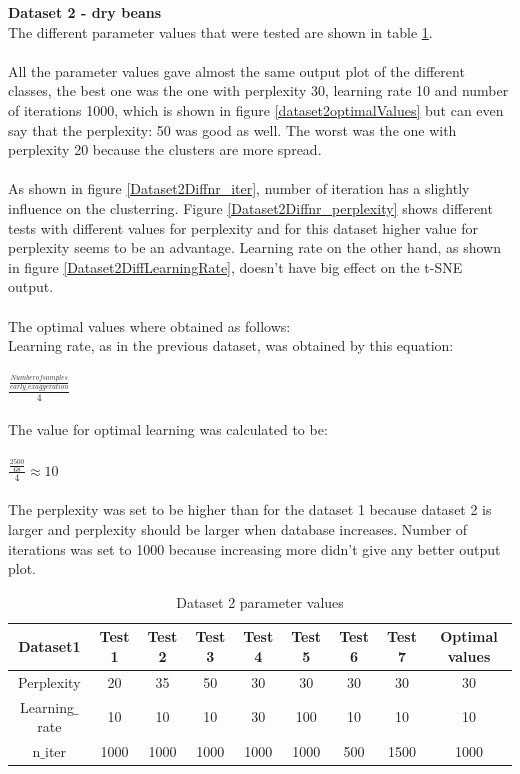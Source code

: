 \documentclass[12pt]{report}
\begin{document}
	\newpage
	\textbf{Dataset 2 - dry beans}\\
	The different parameter values that were tested are shown in table \ref{dataset2ParameterValues}. \\
	\\
	All the parameter values gave almost the same output plot of the different classes, the best one was the one with perplexity 30, learning rate 10 and number of iterations 1000, which is shown in figure \ref{dataset2optimalValues} but can even say that the perplexity: 50 was good as well. The worst was the one with perplexity 20 because the clusters are more spread.\\
	\\
	As shown in figure \ref{Dataset2Diffnr_iter}, number of iteration has a slightly influence on the clusterring. Figure \ref{Dataset2Diffnr_perplexity} shows different tests with different values for perplexity and for this dataset higher value for perplexity seems to be an advantage. Learning rate on the other hand, as shown in figure \ref{Dataset2DiffLearningRate}, doesn't have big effect on the t-SNE output.\\
	\\
	The optimal values where obtained as follows:\\
	Learning rate, as in the previous dataset, was obtained by this equation:\\
	\\
	$\frac{\frac{Number of samples}{early\_exaggeration}}{4}$\\
	\\
	The value for optimal learning was calculated to be:\\
	\\
	$\frac{\frac{2500}{68}}{4} \approx 10$\\
	\\
	The perplexity was set to be higher than for the dataset 1 because dataset 2 is larger and perplexity should be larger when database increases. Number of iterations was set to 1000 because increasing more didn't give any better output plot.\\
	\newpage
	
	\begin{table}[H]
		\centering
		\begin{tabular}{|c|c|c|c|c|c|c|c|c|}
			\hline
			Dataset1 & Test 1 & Test 2 & Test 3 & Test 4 & Test 5 & Test 6 & Test 7& Optimal values \\
			\hline
			Perplexity & 20 & 35 & 50 & 30 & 30 & 30 & 30 & 30 \\
			\hline
			Learning$\_$rate & 10 & 10 & 10 & 30 & 100 & 10 & 10 & 10 \\
			\hline
			n$\_$iter & 1000 & 1000 & 1000 & 1000 & 1000 & 500 & 1500 & 1000 \\
			\hline
		\end{tabular}
		\caption{Dataset 2 parameter values}
		\label{dataset2ParameterValues}
	\end{table}
	
\end{document}
